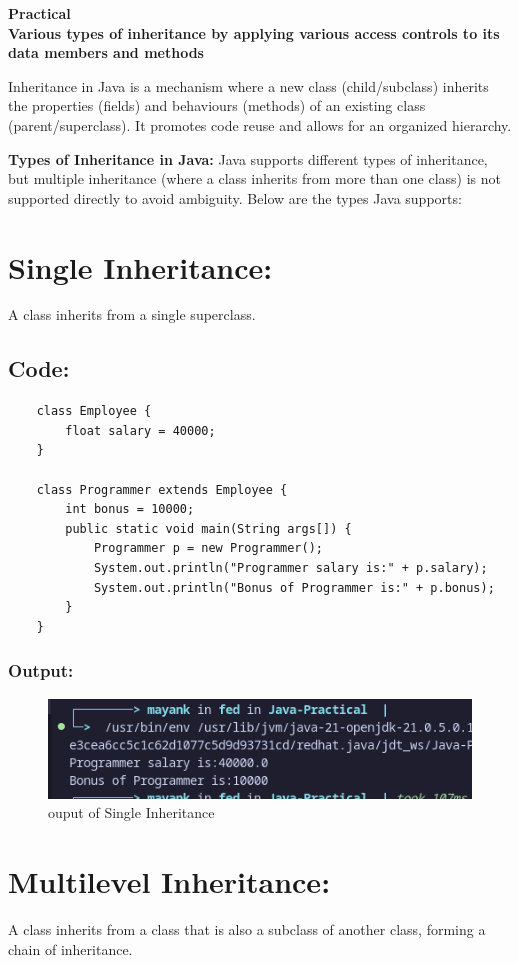 \documentclass[a4paper,12pt]{article}
\newcounter{practicalno} %
\newcommand{\practicaltitle}[1]{
    \stepcounter{practicalno} %
    \newpage
    \begin{center}
        \vspace{1cm}
        \Large\textbf{Practical \thepracticalno} \\
        \vspace{0.5cm}
        \Large\textbf{#1} %
        \normalsize\vspace{1cm}
    \end{center}
}
\begin{document}
\setcounter{section}{0}

\practicaltitle{Various types of inheritance by applying various access controls to its data members and methods}
Inheritance in Java is a mechanism where a new class (child/subclass) inherits the
properties (fields) and behaviours (methods) of an existing class (parent/superclass). It
promotes code reuse and allows for an organized hierarchy.

\textbf{Types of Inheritance in Java:}
Java supports different types of inheritance, but multiple inheritance (where a class
inherits from more than one class) is not supported directly to avoid ambiguity.
Below are the types Java supports:

\section{Single Inheritance:}
A class inherits from a single superclass.
\subsection{Code: }
\begin{lstlisting}
    class Employee {
        float salary = 40000;
    }

    class Programmer extends Employee {
        int bonus = 10000;
        public static void main(String args[]) {
            Programmer p = new Programmer();
            System.out.println("Programmer salary is:" + p.salary);
            System.out.println("Bonus of Programmer is:" + p.bonus);
        }
    }
\end{lstlisting}

\subsubsection{Output:}
\begin{figure}[H]
    \centering
    \includegraphics[width=0.9\linewidth]{images/Programmer.png}
    \caption{ouput of Single Inheritance}
    \label{fig:sample_image}
\end{figure}

\section{Multilevel Inheritance:}
A class inherits from a class that is also a subclass of another class, forming a chain of
inheritance.
\end{document}
